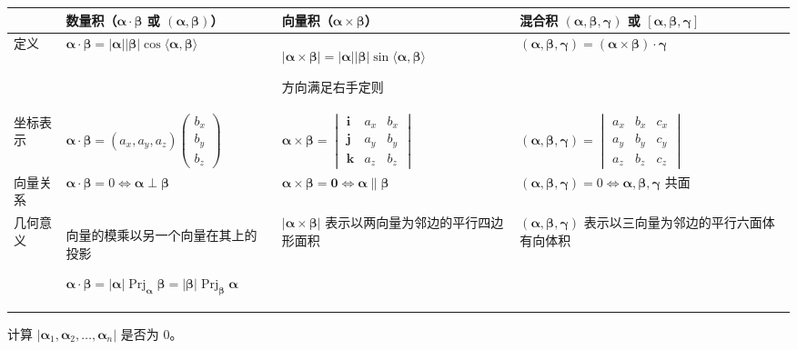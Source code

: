 \documentclass[UTF8,fontset=fandol,zihao=5]{ctexart}
\newcommand{\Prj}{\operatorname{Prj}}
\begin{document}
\small
\begin{longtable}{|>{\centering\arraybackslash}p{2.1cm}|>{\centering\arraybackslash}p{4.7cm}|>{\centering\arraybackslash}p{4.7cm}|>{\centering\arraybackslash}p{4.7cm}|}
\hline
& 数量积（$\bm\alpha\cdot\bm\beta$ 或 $(\bm\alpha,\bm\beta)$）
& 向量积（$\bm\alpha\times\bm\beta$）
& 混合积 $(\bm\alpha,\bm\beta,\bm\gamma)$ 或 $[\bm\alpha,\bm\beta,\bm\gamma]$\\
\hline
定义
& $\bm\alpha\cdot\bm\beta=|\bm\alpha||\bm\beta|\cos\langle\bm\alpha,\bm\beta\rangle$
& $|\bm\alpha\times\bm\beta|=|\bm\alpha||\bm\beta|\sin\langle\bm\alpha,\bm\beta\rangle$

方向满足右手定则
& $(\bm\alpha,\bm\beta,\bm\gamma)=(\bm\alpha\times\bm\beta)\cdot\bm\gamma$\\
\hline
坐标表示
& $\displaystyle\bm\alpha\cdot\bm\beta=(a_x,a_y,a_z)\begin{pmatrix}b_x\\b_y\\b_z\end{pmatrix}$
& $\displaystyle\bm\alpha\times\bm\beta=
\begin{vmatrix}\bm i&a_x&b_x\\\bm j&a_y&b_y\\\bm k&a_z&b_z\end{vmatrix}$
& $\displaystyle(\bm\alpha,\bm\beta,\bm\gamma)=
\begin{vmatrix}a_x&b_x&c_x\\a_y&b_y&c_y\\a_z&b_z&c_z\end{vmatrix}$\\
\hline
向量关系
& $\bm\alpha\cdot\bm\beta=0\Longleftrightarrow\bm\alpha\perp\bm\beta$
& $\bm\alpha\times\bm\beta=\bm0\Longleftrightarrow\bm\alpha\parallel\bm\beta$
& $(\bm\alpha,\bm\beta,\bm\gamma)=0\Longleftrightarrow\bm\alpha,\bm\beta,\bm\gamma$ 共面\\
\hline
几何意义
& 向量的模乘以另一个向量在其上的投影

$\bm\alpha\cdot\bm\beta=|\bm\alpha|\Prj_{\bm\alpha}\bm\beta=|\bm\beta|\Prj_{\bm\beta}\bm\alpha$
& $|\bm\alpha\times\bm\beta|$ 表示以两向量为邻边的平行四边形面积
& $(\bm\alpha,\bm\beta,\bm\gamma)$ 表示以三向量为邻边的平行六面体有向体积\\
\hline
\end{longtable}
\normalsize

\begin{method}[【方法】判断 $n$ 个 $n$ 维向量是否共面]
计算 $|\bm\alpha_1,\bm\alpha_2,\ldots,\bm\alpha_n|$ 是否为 $0$。
\end{method}
\end{document}

